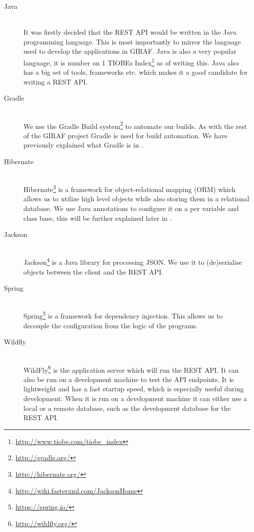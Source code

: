 \begin{description}
    \item[Java] \hfill \\
        It was firstly decided that the REST API would be written in the Java programming language.
        This is most importantly to mirror the language used to develop the applications in GIRAF.
        Java is also a very popular language, it is number on 1 TIOBEs Index\footnote{\url{http://www.tiobe.com/tiobe_index}} as of writing this. 
        Java also has a big set of tools, frameworks etc. which makes it a good candidate for writing a REST API.

    \item[Gradle] \hfill \\
        We use the Gradle Build system\footnote{\url{http://gradle.org/}} to automate our builds. 
        As with the rest of the GIRAF project Gradle is used for build automation. 
        We have previously explained what Gradle is in .

    \item[Hibernate] \hfill \\
        Hibernate\footnote{\url{http://hibernate.org/}} is a framework for object-relational mapping (ORM) which allows us to utilize high level objects while also storing them in a relational database. 
        We use Java annotations to configure it on a per variable and class base, this will be further explained later in .

    \item[Jackson] \hfill \\
        Jackson\footnote{\url{http://wiki.fasterxml.com/JacksonHome}} is a Java library for processing JSON.
        We use it to (de)serialise objects between the client and the REST API. 

    \item[Spring] \hfill \\ 
        Spring\footnote{\url{https://spring.io/}} is a framework for dependency injection. 
        This allows us to decouple the configuration from the logic of the programs. 

    \item[Wildfly] \hfill \\
        WildFly\footnote{\url{http://wildfly.org/}} is the application server which will run the REST API. 
        It can also be run on a development machine to test the API endpoints. 
        It is lightweight and has a fast startup speed, which is especially useful during development. 
        When it is run on a development machine it can either use a local or a remote database, such as the development database for the REST API. 


\end{description}
